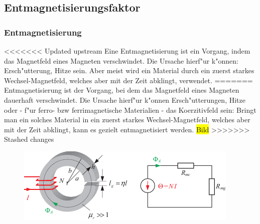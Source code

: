     \subsection{Entmagnetisierungsfaktor}

        \subsubsection*{Entmagnetisierung}
<<<<<<< Updated upstream
            Eine Entmagnetisierung ist ein Vorgang, indem das Magnetfeld eines Magneten verschwindet.
            Die Ursache hierf"ur k"onnen: Ersch"utterung, Hitze sein. Aber meist wird ein Material
            durch ein zuerst starkes Wechsel-Magnetfeld, welches aber mit der Zeit abklingt, verwendet.
=======
    		Entmagnetisierung ist der Vorgang, bei dem das Magnetfeld eines Magneten dauerhaft verschwindet.
            Die Ursache hierf"ur k"onnen Ersch"utterungen, Hitze oder - f"ur ferro- bzw ferrimagnetische Materialien - das Koerzitivfeld sein: Bringt man ein solches Material
            in ein zuerst starkes Wechsel-Magnetfeld, welches aber mit der Zeit abklingt, kann es gezielt entmagnetisiert werden.
            \hl{Bild}
>>>>>>> Stashed changes
            \begin{figure}[H]
                \centering
                \includegraphics{images/Ringkern}
            \end{figure}
